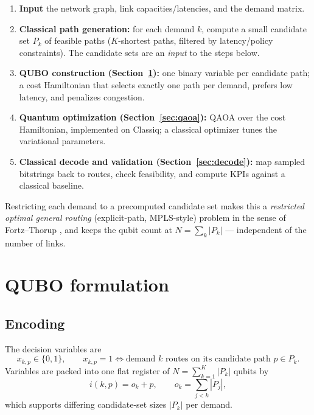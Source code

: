 \documentclass[11pt]{article}
\begin{document}
\begin{enumerate}
  \item \textbf{Input} the network graph, link capacities/latencies, and the
        demand matrix.
  \item \textbf{Classical path generation:} for each demand $k$, compute a
        small candidate set $P_k$ of feasible paths ($K$-shortest paths,
        filtered by latency/policy constraints). The candidate sets are an
        \emph{input} to the steps below.
  \item \textbf{QUBO construction (Section~\ref{sec:qubo}):} one binary
        variable per candidate path; a cost Hamiltonian that selects exactly
        one path per demand, prefers low latency, and penalizes congestion.
  \item \textbf{Quantum optimization (Section~\ref{sec:qaoa}):} QAOA over the
        cost Hamiltonian, implemented on Classiq; a classical optimizer tunes
        the variational parameters.
  \item \textbf{Classical decode and validation
        (Section~\ref{sec:decode}):} map sampled bitstrings back to routes,
        check feasibility, and compute KPIs against a classical baseline.
\end{enumerate}

Restricting each demand to a precomputed candidate set makes this a
\emph{restricted optimal general routing} (explicit-path, MPLS-style) problem
in the sense of Fortz--Thorup \cite{fortz2000}, and keeps the qubit count at
$N = \sum_k |P_k|$ --- independent of the number of links.

\section{QUBO formulation}
\label{sec:qubo}

\subsection{Encoding}

The decision variables are
\begin{equation}
  x_{k,p} \in \{0,1\}, \qquad
  x_{k,p} = 1 \iff \text{demand } k \text{ routes on its candidate path }
  p \in P_k .
\end{equation}
Variables are packed into one flat register of
$N = \sum_{k=1}^{K} |P_k|$ qubits by
\begin{equation}
  i(k,p) = o_k + p, \qquad o_k = \sum_{j<k} |P_j| ,
\end{equation}
which supports differing candidate-set sizes $|P_k|$ per demand.
\end{document}
